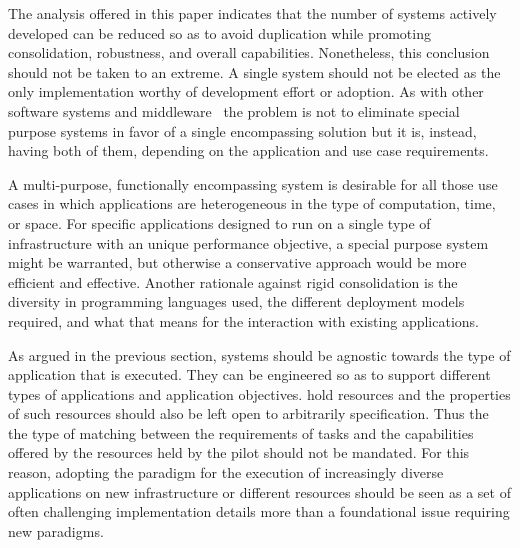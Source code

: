 \documentclass{sig-alternate}
\begin{document}
The analysis offered in this paper indicates that the number of \pilot systems
actively developed can be reduced so as to avoid duplication while promoting
consolidation, robustness, and overall capabilities.  Nonetheless, this
conclusion should not be taken to an extreme. A single \pilot system should not
be elected as the only implementation worthy of development effort or adoption.
As with other software systems and middleware~\cite{bernstein1996} the problem
is not to eliminate special purpose systems in favor of a single encompassing
solution but it is, instead, having both of them, depending on the application
and use case requirements.

A multi-purpose, functionally encompassing \pilot system is desirable for all
those use cases in which applications are heterogeneous in the type of
computation, time, or space. For specific applications designed to run on a
single type of infrastructure with an unique performance objective, a special
purpose system might be warranted, but otherwise a conservative approach would
be more efficient and effective. Another rationale against rigid consolidation
is the diversity in programming languages used, the different deployment models
required, and what that means for the interaction with existing applications.

As argued in the previous section, \pilot systems should be agnostic towards the
type of application that is executed. They can be engineered so as to support
different types of applications and application objectives. \pilots hold
resources and the properties of such resources should also be left open to
arbitrarily specification. Thus the the type of matching between the
requirements of tasks and the capabilities offered by the resources held by the
pilot should not be mandated. For this reason, adopting the \pilot paradigm for
the execution of increasingly diverse applications on new infrastructure or
different resources should be seen as a set of often challenging implementation
details more than a foundational issue requiring new paradigms.


\end{document}

